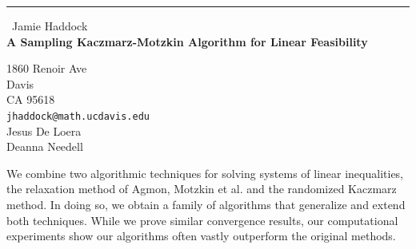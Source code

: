 \documentclass{report}
\begin{document}
\begin{center}
\rule{6in}{1pt} \
{\large Jamie Haddock \\
{\bf A Sampling Kaczmarz-Motzkin Algorithm for Linear Feasibility}}

1860 Renoir Ave \\ Davis \\ CA 95618
\\
{\tt jhaddock@math.ucdavis.edu}\\
Jesus De Loera\\
Deanna Needell\end{center}

We combine two algorithmic techniques for solving systems of linear
inequalities, the relaxation method of Agmon, Motzkin et al. and the
randomized Kaczmarz method. In doing so, we obtain a family of algorithms
that generalize and extend both techniques. While we prove similar
convergence results, our computational experiments show our algorithms
often vastly outperform the original methods.
\end{document}
